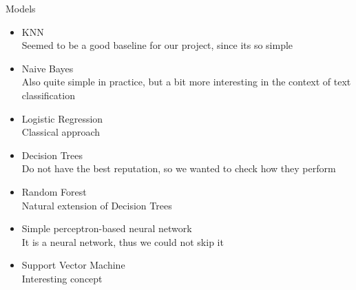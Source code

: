 \documentclass{beamer}
\begin{document}
\begin{frame}[t]{Models}

\vspace{-3mm}

\begin{itemize}
\item KNN \\
Seemed to be a good baseline for our project, since its so simple

\pause
\item Naive Bayes \\
Also quite simple in practice, but a bit more interesting in the context of text classification

\pause
\item Logistic Regression \\
Classical approach

\pause
\item Decision Trees \\
Do not have the best reputation, so we wanted to check how they perform

\pause
\item Random Forest \\
Natural extension of Decision Trees

\pause
\item Simple perceptron-based neural network \\
It is a neural network, thus we could not skip it

\pause
\item Support Vector Machine \\
Interesting concept
\end{itemize}
\end{frame}
\end{document}
